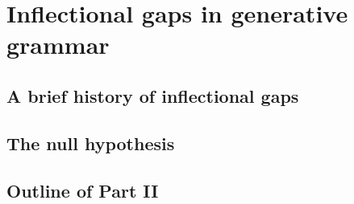 \chapter{Inflectional gaps in generative grammar}

\section{A brief history of inflectional gaps} 
\section{The null hypothesis}                  
\section{Outline of Part II}                   
